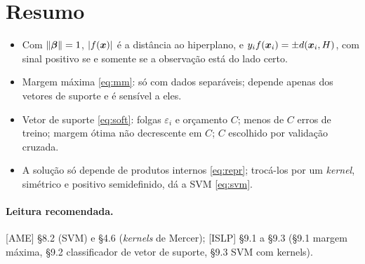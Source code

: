 \documentclass[11pt,a4paper]{article}
\begin{document}
\section*{Resumo}
\begin{itemize}[leftmargin=1.4cm]
  \item Com $\left\lVert \bm{\beta} \right\rVert=1$, $\left\lvert f(\bm{x}) \right\rvert$ é a distância ao hiperplano, e
        $y_if(\bm{x}_i)=\pm d(\bm{x}_i,H)$, com sinal positivo se e somente se a observação
        está do lado certo.
  \item Margem máxima \eqref{eq:mm}: só com dados separáveis; depende apenas dos
        vetores de suporte e é sensível a eles.
  \item Vetor de suporte \eqref{eq:soft}: folgas $\varepsilon_i$ e orçamento $C$; menos
        de $C$ erros de treino; margem ótima não decrescente em $C$; $C$ escolhido
        por validação cruzada.
  \item A solução só depende de produtos internos \eqref{eq:repr}; trocá-los por um
        \emph{kernel}, simétrico e positivo semidefinido, dá a SVM \eqref{eq:svm}.
\end{itemize}

\paragraph{Leitura recomendada.} [AME] §8.2 (SVM) e §4.6 (\emph{kernels} de Mercer);
[ISLP] §9.1 a §9.3 (§9.1 margem máxima, §9.2 classificador de vetor de suporte, §9.3
SVM com kernels).
\end{document}
